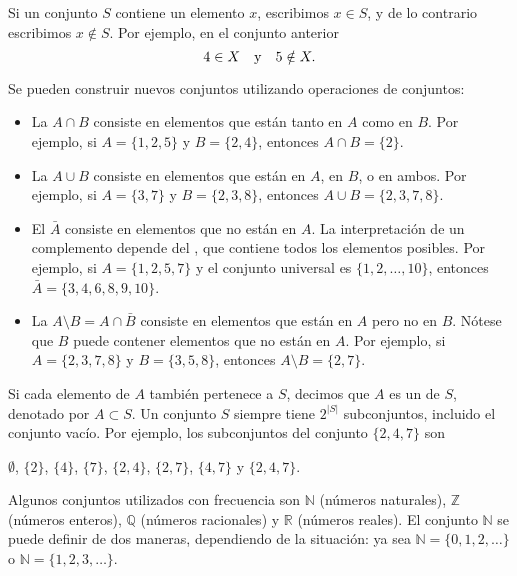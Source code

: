 Si un conjunto $S$ contiene un elemento $x$,
escribimos $x \in S$,
y de lo contrario escribimos $x \notin S$.
Por ejemplo, en el conjunto anterior
\[4 \in X \hspace{10px}\textrm{y}\hspace{10px} 5 \notin X.\]

\begin{samepage}
    Se pueden construir nuevos conjuntos utilizando operaciones de conjuntos:
    \begin{itemize}
        \item La  $A \cap B$ consiste en elementos
              que están tanto en $A$ como en $B$.
              Por ejemplo, si $A=\{1,2,5\}$ y $B=\{2,4\}$,
              entonces $A \cap B = \{2\}$.
        \item La  $A \cup B$ consiste en elementos
              que están en $A$, en $B$, o en ambos.
              Por ejemplo, si $A=\{3,7\}$ y $B=\{2,3,8\}$,
              entonces $A \cup B = \{2,3,7,8\}$.
        \item El  $\bar A$ consiste en elementos
              que no están en $A$.
              La interpretación de un complemento depende del
              , que contiene todos los elementos posibles.
              Por ejemplo, si $A=\{1,2,5,7\}$ y el conjunto universal es
              $\{1,2,\ldots,10\}$, entonces $\bar A = \{3,4,6,8,9,10\}$.
        \item La  $A \setminus B = A \cap \bar B$
              consiste en elementos que están en $A$ pero no en $B$.
              Nótese que $B$ puede contener elementos que no están en $A$.
              Por ejemplo, si $A=\{2,3,7,8\}$ y $B=\{3,5,8\}$,
              entonces $A \setminus B = \{2,7\}$.
    \end{itemize}
\end{samepage}

Si cada elemento de $A$ también pertenece a $S$,
decimos que $A$ es un  de $S$,
denotado por $A \subset S$.
Un conjunto $S$ siempre tiene $2^{|S|}$ subconjuntos,
incluido el conjunto vacío.
Por ejemplo, los subconjuntos del conjunto $\{2,4,7\}$ son
\begin{center}
    $\emptyset$,
    $\{2\}$, $\{4\}$, $\{7\}$, $\{2,4\}$, $\{2,7\}$, $\{4,7\}$ y $\{2,4,7\}$.
\end{center}

Algunos conjuntos utilizados con frecuencia son
$\mathbb{N}$ (números naturales),
$\mathbb{Z}$ (números enteros),
$\mathbb{Q}$ (números racionales) y
$\mathbb{R}$ (números reales).
El conjunto $\mathbb{N}$
se puede definir de dos maneras, dependiendo
de la situación:
ya sea $\mathbb{N}=\{0,1,2,\ldots\}$
o $\mathbb{N}=\{1,2,3,\ldots\}$.

